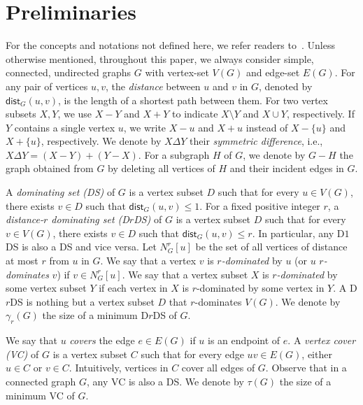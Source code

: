 \documentclass[a4paper]{article}
\theoremstyle{plain}
\theoremstyle{definition}
\newcommand{\dist}{\mathsf{dist}} %
\begin{document}
\section{Preliminaries}
\label{sec:preliminaries}

For the concepts and notations not defined here, we refer readers to~\cite{Diestel2017}.
Unless otherwise mentioned, throughout this paper, we always consider simple, connected, undirected graphs $G$ with vertex-set $V(G)$ and edge-set $E(G)$.
For any pair of vertices $u, v$, the \textit{distance} between $u$ and $v$ in $G$, denoted by $\dist_G(u, v)$, is the length of a shortest path between them.
For two vertex subsets $X, Y$, we use $X - Y$ and $X + Y$ to indicate $X \setminus Y$ and $X \cup Y$, respectively.
If $Y$ contains a single vertex $u$, we write $X - u$ and $X + u$ instead of $X - \{u\}$ and $X + \{u\}$, respectively.
We denote by $X \Delta Y$ their \textit{symmetric difference}, i.e., $X \Delta Y = (X - Y) + (Y - X)$.
For a subgraph $H$ of $G$, we denote by $G - H$ the graph obtained from $G$ by deleting all vertices of $H$ and their incident edges in $G$.

A \textit{dominating set (DS)} of $G$ is a vertex subset $D$ such that for every $u \in V(G)$, there exists $v \in D$ such that $\dist_G(u, v) \leq 1$.
For a fixed positive integer $r$, a \textit{distance-$r$ dominating set (D$r$DS)} of $G$ is a vertex subset $D$ such that for every $v \in V(G)$, there exists $v \in D$ such that $\dist_G(u, v) \leq r$.
In particular, any D$1$DS is also a DS and vice versa.
Let $N^r_G[u]$ be the set of all vertices of distance at most $r$ from $u$ in $G$.
We say that a vertex $v$ is \textit{$r$-dominated} by $u$ (or $u$ \textit{$r$-dominates} $v$) if $v \in N^r_G[u]$.
We say that a vertex subset $X$ is \textit{$r$-dominated} by some vertex subset $Y$ if each vertex in $X$ is $r$-dominated by some vertex in $Y$.
A D$r$DS is nothing but a vertex subset $D$ that $r$-dominates $V(G)$.
We denote by $\gamma_r(G)$ the size of a minimum D$r$DS of $G$.

We say that $u$ \textit{covers} the edge $e \in E(G)$ if $u$ is an endpoint of $e$.
A \textit{vertex cover (VC)} of $G$ is a vertex subset $C$ such that for every edge $uv \in E(G)$, either $u \in C$ or $v \in C$.
Intuitively, vertices in $C$ cover all edges of $G$.
Observe that in a connected graph $G$, any VC is also a DS.
We denote by $\tau(G)$ the size of a minimum VC of $G$.
\end{document}
